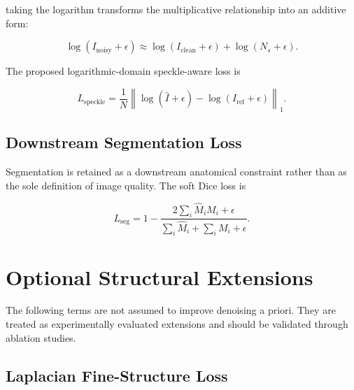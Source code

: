 \documentclass[conference]{IEEEtran}
\begin{document}
taking the logarithm transforms the multiplicative relationship
into an additive form:

\begin{equation}
\log(I_{\mathrm{noisy}}+\epsilon)
\approx
\log(I_{\mathrm{clean}}+\epsilon)
+
\log(N_s+\epsilon).
\end{equation}

The proposed logarithmic-domain speckle-aware loss is

\begin{equation}
L_{\mathrm{speckle}}
=
\frac{1}{N}
\left\|
\log(\hat I+\epsilon)
-
\log(I_{\mathrm{ref}}+\epsilon)
\right\|_1.
\label{eq:speckle_loss}
\end{equation}



\subsection{Downstream Segmentation Loss}

Segmentation is retained as a downstream anatomical constraint rather
than as the sole definition of image quality. The soft Dice loss is

\begin{equation}
L_{\mathrm{seg}}
=
1-
\frac{
2\sum_i\hat M_iM_i+\epsilon
}{
\sum_i\hat M_i+\sum_iM_i+\epsilon
}.
\label{eq:dice_loss}
\end{equation}



\section{Optional Structural Extensions}

The following terms are not assumed to improve denoising a priori.
They are treated as experimentally evaluated extensions and should
be validated through ablation studies.


\subsection{Laplacian Fine-Structure Loss}
\end{document}
